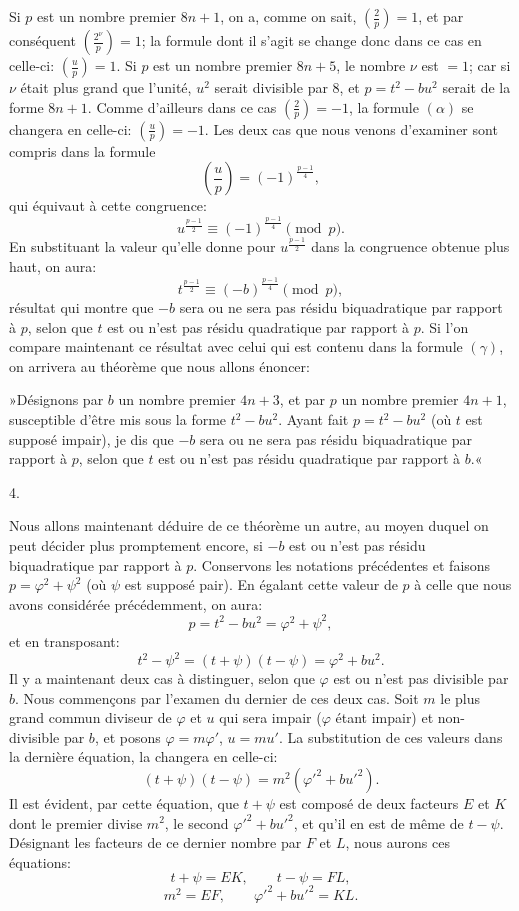 \documentclass[11pt]{article}
\newcommand{\leg}[2]{\left(\frac{#1}{#2}\right)}
\newcommand{\unitid}[1]{\hypertarget{#1}{}}
\begin{document}
\unitid{dirichlet.v1.p04a.par.021}Si $p$ est un nombre premier $8n+1$, on a, comme on sait, $\leg{2}{p}=1$, et par conséquent $\leg{2^\nu}{p}=1$; la formule dont il s'agit se change donc dans ce cas en celle-ci: $\leg{u}{p}=1$. Si $p$ est un nombre premier $8n+5$, le nombre $\nu$ est $=1$; car si $\nu$ était plus grand que l'unité, $u^2$ serait divisible par $8$, et $p=t^2-bu^2$ serait de la forme $8n+1$. Comme d'ailleurs dans ce cas $\leg{2}{p}=-1$, la formule $(\alpha)$ se changera en celle-ci: $\leg{u}{p}=-1$. Les deux cas que nous venons d'examiner sont compris dans la formule
\[
 \leg{u}{p}=(-1)^{\frac{p-1}{4}},
\]
qui équivaut à cette congruence:
\[
 u^{\frac{p-1}{2}}\equiv (-1)^{\frac{p-1}{4}}\pmod p.
\]
En substituant la valeur qu'elle donne pour $u^{\frac{p-1}{2}}$ dans la congruence obtenue plus haut, on aura:
\[
 t^{\frac{p-1}{2}}\equiv (-b)^{\frac{p-1}{4}}\pmod p,
\]
résultat qui montre que $-b$ sera ou ne sera pas résidu biquadratique par rapport à $p$, selon que $t$ est ou n'est pas résidu quadratique par rapport à $p$. Si l'on compare maintenant ce résultat avec celui qui est contenu dans la formule $(\gamma)$, on arrivera au théorème que nous allons énoncer:

\unitid{dirichlet.v1.p04a.thm.006}»Désignons par $b$ un nombre premier $4n+3$, et par $p$ un nombre premier $4n+1$, susceptible d'être mis sous la forme $t^2-bu^2$. Ayant fait $p=t^2-bu^2$ (où $t$ est supposé impair), je dis que $-b$ sera ou ne sera pas résidu biquadratique par rapport à $p$, selon que $t$ est ou n'est pas résidu quadratique par rapport à $b$.«

\begin{center}4.\end{center}

\unitid{dirichlet.v1.p04a.par.022}Nous allons maintenant déduire de ce théorème un autre, au moyen duquel on peut décider plus promptement encore, si $-b$ est ou n'est pas résidu biquadratique par rapport à $p$. Conservons les notations précédentes et faisons $p=\varphi^2+\psi^2$ (où $\psi$ est supposé pair). En égalant cette valeur de $p$ à celle que nous avons considérée précédemment, on aura:
\[
 p=t^2-bu^2=\varphi^2+\psi^2,
\]
et en transposant:
\[
 t^2-\psi^2=(t+\psi)(t-\psi)=\varphi^2+bu^2.
\]
Il y a maintenant deux cas à distinguer, selon que $\varphi$ est ou n'est pas divisible par $b$. Nous commençons par l'examen du dernier de ces deux cas. Soit $m$ le plus grand commun diviseur de $\varphi$ et $u$ qui sera impair ($\varphi$ étant impair) et non-divisible par $b$, et posons $\varphi=m\varphi'$, $u=mu'$. La substitution de ces valeurs dans la dernière équation, la changera en celle-ci:
\[
 (t+\psi)(t-\psi)=m^2(\varphi'^2+bu'^2).
\]
Il est évident, par cette équation, que $t+\psi$ est composé de deux facteurs $E$ et $K$ dont le premier divise $m^2$, le second $\varphi'^2+bu'^2$, et qu'il en est de même de $t-\psi$. Désignant les facteurs de ce dernier nombre par $F$ et $L$, nous aurons ces équations:
\[
 t+\psi=EK,
\qquad t-\psi=FL,
\]
\[
 m^2=EF,
\qquad \varphi'^2+bu'^2=KL.
\]
\end{document}
